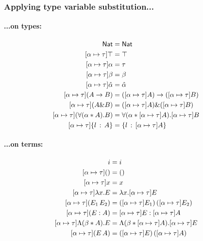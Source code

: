 \documentclass{article}
\newcommand{\mypar}[1]{\vspace{0.2cm}\paragraph{#1:} \hfill\vspace{0.1cm}}
\begin{document}
\subsubsection{Applying type variable substitution...}
\begin{minipage}[t]{0.5\textwidth}
  \mypar{{...on types}}
  \begin{align*}
    [{\alpha}\mapsto{\tau}]\nat                  &= \nat\\
    [{\alpha}\mapsto{\tau}]\top                  &= \top\\
    [{\alpha}\mapsto{\tau}]\alpha                &= \tau\\
    [{\alpha}\mapsto{\tau}]\beta                 &= \beta\\
    [{\alpha}\mapsto{\tau}]\hat\alpha            &= \hat\alpha\\
    [{\alpha}\mapsto{\tau}](A\to B)              &= ([\substitution{\alpha}{\tau}]A)\to([\substitution{\alpha}{\tau}]B)\\
    [{\alpha}\mapsto{\tau}](A\& B)               &= ([\substitution{\alpha}{\tau}]A)\&([\substitution{\alpha}{\tau}]B)\\
    [{\alpha}\mapsto{\tau}](\Tabs{\alpha}{A}{B}) &= \Tabs{\alpha}{[\substitution{\alpha}{\tau}]A}{[\substitution{\alpha}{\tau}]B}\\
    [{\alpha}\mapsto{\tau}]\trecord{l}{A}        &= \trecord{l}{[\substitution{\alpha}{\tau}]A}
  \end{align*}
\end{minipage}
\begin{minipage}[t]{0.5\textwidth}
  \mypar{{...on terms}}
  \begin{align*}
    [\substitution{\alpha}{\tau}]i &= i\\
    [\substitution{\alpha}{\tau}]() &= ()\\
    [\substitution{\alpha}{\tau}]x &= x\\
    [\substitution{\alpha}{\tau}]\abs{x}{E} &= \abs{x}{[\substitution{\alpha}{\tau}]E}\\
    [\substitution{\alpha}{\tau}](E_1\,E_2) &= ([\substitution{\alpha}{\tau}]E_1)\,([\substitution{\alpha}{\tau}]E_2)\\
    [\substitution{\alpha}{\tau}](E : A) &= [\substitution{\alpha}{\tau}]E : [\substitution{\alpha}{\tau}]A\\
    [\substitution{\alpha}{\tau}]\tabs{\beta}{A}{E} &= \tabs{\beta}{[\substitution{\alpha}{\tau}]A}{[\substitution{\alpha}{\tau}]E}\\
    [\substitution{\alpha}{\tau}](E\,A) &= ([\substitution{\alpha}{\tau}]E)\, ([\substitution{\alpha}{\tau}]A)
  \end{align*}
\end{minipage}\\
\end{document}
